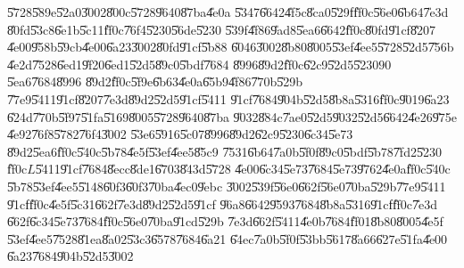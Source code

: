 \U{5728}\U{589e}\U{52a0}\U{3002}\U{800c}\U{5728}\U{9640}\U{87ba}\U{4e0a}%
\U{5347}\U{6642}\U{4f5c}\U{8ca0}\U{529f}\U{ff0c}\U{56e0}\U{6b64}\U{7e3d}%
\U{80fd}\U{53c8}\U{6e1b}\U{5c11}\U{ff0c}\U{76f4}\U{5230}\U{56de}\U{5230}%
\U{539f}\U{4f86}\U{9ad8}\U{5ea6}\U{6642}\U{ff0c}\U{80fd}\U{91cf}\U{8207}%
\U{4e00}\U{958b}\U{59cb}\U{4e00}\U{6a23}\U{3002}\U{80fd}\U{91cf}\U{5b88}%
\U{6046}\U{3002}\U{8b80}\U{8005}\U{53ef}\U{4ee5}\U{5728}\U{52d5}\U{756b}%
\U{4e2d}\U{7528}\U{6ed1}\U{9f20}\U{6ed1}\U{52d5}\U{89c0}\U{5bdf}\U{7684}%
\U{8996}\U{89d2}\U{ff0c}\U{62c9}\U{52d5}\U{5230}$90$\U{5ea6}\U{7684}\U{8996}%
\U{89d2}\U{ff0c}\U{5f9e}\U{6b63}\U{4e0a}\U{65b9}\U{4f86}\U{770b}\U{529b}%
\U{77e9}\U{5411}\U{91cf}\U{8207}\U{7e3d}\U{89d2}\U{52d5}\U{91cf}\U{5411}%
\U{91cf}\U{7684}\U{904b}\U{52d5}\U{8b8a}\U{5316}\U{ff0c}\U{9019}\U{6a23}%
\U{624d}\U{770b}\U{5f97}\U{51fa}\U{5169}\U{8005}\U{5728}\U{9640}\U{87ba}%
\U{9032}\U{884c}\U{7ae0}\U{52d5}\U{9032}\U{52d5}\U{6642}\U{4e26}\U{975e}%
\U{4e92}\U{76f8}\U{5782}\U{76f4}\U{3002}\newline
\U{53e6}\U{5916}\U{5c07}\U{8996}\U{89d2}\U{62c9}\U{5230}\U{6c34}\U{5e73}%
\U{89d2}\U{5ea6}\U{ff0c}\U{540c}\U{5b78}\U{4e5f}\U{53ef}\U{4ee5}\U{85c9}%
\U{7531}\U{6b64}\U{7a0b}\U{5f0f}\U{89c0}\U{5bdf}\U{5b78}\U{7fd2}\U{5230}%
\U{ff0c}$L$\U{5411}\U{91cf}\U{7684}\U{8ecc}\U{8de1}\U{6703}\U{843d}\U{5728}%
\U{4e00}\U{6c34}\U{5e73}\U{7684}\U{5e73}\U{9762}\U{4e0a}\U{ff0c}\U{540c}%
\U{5b78}\U{53ef}\U{4ee5}\U{5148}\U{60f3}\U{60f3}\U{70ba}\U{4ec0}\U{9ebc}%
\U{3002}\U{539f}\U{56e0}\U{662f}\U{56e0}\U{70ba}\U{529b}\U{77e9}\U{5411}%
\U{91cf}\U{ff0c}\U{4e5f}\U{5c31}\U{662f}\U{7e3d}\U{89d2}\U{52d5}\U{91cf}%
\U{96a8}\U{6642}\U{9593}\U{7684}\U{8b8a}\U{5316}\U{91cf}\U{ff0c}\U{7e3d}%
\U{662f}\U{6c34}\U{5e73}\U{7684}\U{ff0c}\U{56e0}\U{70ba}\U{91cd}\U{529b}%
\U{7e3d}\U{662f}\U{5411}\U{4e0b}\U{7684}\U{ff01}\U{8b80}\U{8005}\U{4e5f}%
\U{53ef}\U{4ee5}\U{7528}\U{81ea}\U{8a02}\U{53c3}\U{6578}\U{7684}\U{6a21}%
\U{64ec}\U{7a0b}\U{5f0f}\U{53bb}\U{5617}\U{8a66}\U{627e}\U{51fa}\U{4e00}%
\U{6a23}\U{7684}\U{904b}\U{52d5}\U{3002}

